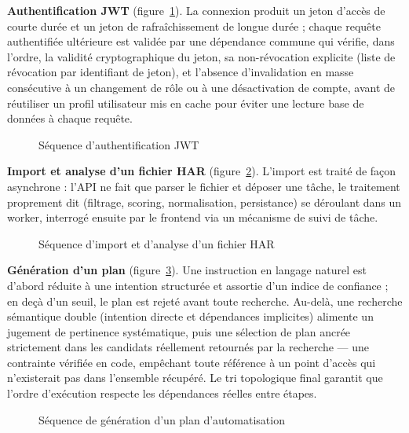 \textbf{Authentification JWT} (figure~\ref{fig:seq-jwt}). La connexion produit un jeton d'accès de courte durée et un jeton de rafraîchissement de longue durée ; chaque requête authentifiée ultérieure est validée par une dépendance commune qui vérifie, dans l'ordre, la validité cryptographique du jeton, sa non-révocation explicite (liste de révocation par identifiant de jeton), et l'absence d'invalidation en masse consécutive à un changement de rôle ou à une désactivation de compte, avant de réutiliser un profil utilisateur mis en cache pour éviter une lecture base de données à chaque requête.

\begin{figure}[H]
  \centering
  \caption{Séquence d'authentification JWT}
  \label{fig:seq-jwt}
\end{figure}

\textbf{Import et analyse d'un fichier HAR} (figure~\ref{fig:seq-har}). L'import est traité de façon asynchrone : l'API ne fait que parser le fichier et déposer une tâche, le traitement proprement dit (filtrage, scoring, normalisation, persistance) se déroulant dans un worker, interrogé ensuite par le frontend via un mécanisme de suivi de tâche.

\begin{figure}[H]
  \centering
  \caption{Séquence d'import et d'analyse d'un fichier HAR}
  \label{fig:seq-har}
\end{figure}

\textbf{Génération d'un plan} (figure~\ref{fig:seq-plan}). Une instruction en langage naturel est d'abord réduite à une intention structurée et assortie d'un indice de confiance ; en deçà d'un seuil, le plan est rejeté avant toute recherche. Au-delà, une recherche sémantique double (intention directe et dépendances implicites) alimente un jugement de pertinence systématique, puis une sélection de plan ancrée strictement dans les candidats réellement retournés par la recherche — une contrainte vérifiée en code, empêchant toute référence à un point d'accès qui n'existerait pas dans l'ensemble récupéré. Le tri topologique final garantit que l'ordre d'exécution respecte les dépendances réelles entre étapes.

\begin{figure}[H]
  \centering
  \caption{Séquence de génération d'un plan d'automatisation}
  \label{fig:seq-plan}
\end{figure}

